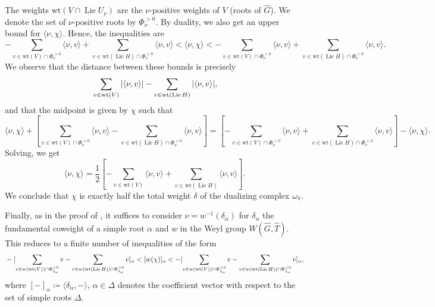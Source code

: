 \documentclass{amsart}
\theoremstyle{definition}
\theoremstyle{remark}
\numberwithin{equation}{section}
\DeclareMathOperator{\Lie}{Lie}
\newcommand{\wh}{\widehat}
\newcommand{\V}{\mathbb{V}}
\newcommand{\wt}{\mathrm{wt}}
\begin{document}
The weights $\wt(V \cap \Lie U_{\nu})$ are the $\nu$-positive weights of $V$ (roots of $\wh G$). We denote the set of $\nu$-positive roots by $\Phi^{>0}_{\nu}$. By duality, we also get an upper bound for $\langle \nu, \chi \rangle$. Hence, the inequalities are
\begin{equation}\label{eq: CuspidalInequalitiesAll}
 -\sum\limits_{v \in \wt(V) \cap \Phi^{>0}_{\nu}} \langle \nu, v \rangle + \sum\limits_{v \in \wt(\Lie H) \cap \Phi^{>0}_{\nu}} \langle \nu, v \rangle < \langle \nu, \chi \rangle <  -\sum\limits_{v \in \wt(V) \cap \Phi^{<0}_{\nu}} \langle \nu, v \rangle + \sum\limits_{v \in \wt(\Lie H) \cap \Phi^{<0}_{\nu}} \langle \nu, v \rangle.
\end{equation}
We observe that the distance between these bounds is precisely 
\begin{equation}{\label{eqn: bmkleqn}}
    \sum\limits_{v \in \wt(V)} | \langle \nu, v \rangle | - \sum\limits_{v \in \wt(\Lie H)} |\langle \nu, v \rangle|,
\end{equation}
and that the midpoint is given by $\chi$ such that
\begin{equation*}
    \langle \nu, \chi \rangle + [\sum\limits_{v \in \wt(V) \cap \Phi^{>0}_{\nu}} \langle \nu, v \rangle - \sum\limits_{v \in \wt(\Lie H) \cap \Phi^{>0}_{\nu}} \langle \nu, v \rangle] =  [-\sum\limits_{v \in \wt(V) \cap \Phi^{<0}_{\nu}} \langle \nu, v \rangle + \sum\limits_{v \in \wt(\Lie H) \cap \Phi^{<0}_{\nu}} \langle \nu, v \rangle] - \langle \nu, \chi \rangle.
\end{equation*}
Solving, we get
\begin{equation*}
    \langle \nu, \chi \rangle = \frac{1}{2}[- \sum\limits_{v \in \wt(V)} \langle \nu, v \rangle + \sum\limits_{v \in \wt(\Lie H)} \langle \nu, v \rangle].
\end{equation*}
We conclude that $\chi$ is exactly half the total weight $\delta$ of the dualizing complex $\omega_{\V}$.

Finally, as in the proof of \cite[Proposition 2.5]{BMKL}, it suffices to consider $\nu = w^{-1}(\delta_{\alpha})$ for $\delta_{\alpha}$ the fundamental coweight of a simple root $\alpha$ and $w$ in the Weyl group $W(\wh{G}, \wh{T})$. This reduces to a finite number of inequalities of the form
\begin{equation}{\label{eqn: weylcuspineq}}
  -[\sum\limits_{v \in w(\wt(V)) \cap \Phi^{>0}_{\delta_{\alpha}}} v - \sum\limits_{v \in w(\wt(\Lie H)) \cap \Phi^{>0}_{\delta_{\alpha}}} v]_{\alpha}  < [w(\chi)]_{\alpha} < -[\sum\limits_{v \in w(\wt(V)) \cap \Phi^{<0}_{\delta_{\alpha}}}v - \sum\limits_{v \in w(\wt(\Lie H)) \cap \Phi^{<0}_{\delta_{\alpha}}} v]_{\alpha},
\end{equation}
where $[ - ]_{\alpha}\coloneq \langle \delta_\alpha, -\rangle$, $\alpha\in \Delta$ denotes the coefficient vector with respect to the set of simple roots $\Delta$. 
\end{document}
